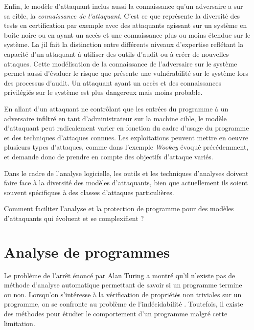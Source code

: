         Enfin, le modèle d'attaquant inclus aussi la connaissance qu'un adversaire a sur sa cible, la \textit{connaissance de l'attaquant}. C'est ce que représente la diversité des tests en certification par exemple avec des attaquants agissant sur un système en boite noire ou en ayant un accès et une connaissance plus ou moins étendue sur le système. La \gls{jil} \cite{JIL} fait la distinction entre différents niveaux d'expertise reflétant la capacité d'un attaquant à utiliser des outils d'audit ou à créer de nouvelles attaques. Cette modélisation de la connaissance de l'adversaire sur le système permet aussi d'évaluer le risque que présente une vulnérabilité sur le système lors des processus d'audit. Un attaquant ayant un accès et des connaissances privilégiés sur le système est plus dangereux mais moins probable.
        
        En allant d'un attaquant ne contrôlant que les entrées du programme à un adversaire infiltré en tant d'administrateur sur la machine cible, le modèle d'attaquant peut radicalement varier en fonction du cadre d'usage du programme et des techniques d'attaques connues. Les exploitations peuvent mettre en oeuvre plusieurs types d'attaques, comme dans l'exemple \textit{Wookey} évoqué précédemment, et demande donc de prendre en compte des objectifs d'attaque variés.
        
        Dans le cadre de l'analyse logicielle, les outils et les techniques d'analyses doivent faire face à la diversité des modèles d'attaquants, bien que actuellement ils soient souvent spécifiques à des classes d'attaques particulières.
        
        \begin{probl}
            \label{prob:evolving-models}
            Comment faciliter l'analyse et la protection de programme pour des modèles d'attaquants qui évoluent et se complexifient ? 
        \end{probl}
        
    \section{Analyse de programmes}
    \label{sec:analysis}
        
        \begin{sloppypar}
        Le problème de l'arrêt énoncé par Alan Turing \cite{Turing/37} a montré qu'il n'existe pas de méthode d'analyse automatique permettant de savoir si un programme termine ou non. Lorsqu'on s'intéresse à la vérification de propriétés non triviales sur un programme, on se confronte au problème de l'indécidabilité \cite{Bradley/VMCAI06}. Toutefois, il existe des méthodes pour étudier le comportement d'un programme malgré cette limitation.
        \end{sloppypar}
        
